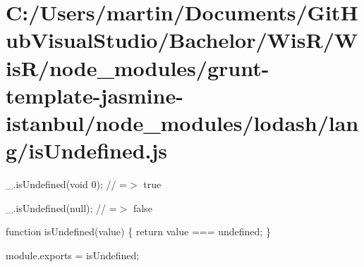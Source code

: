 \hypertarget{_c_1_2_users_2martin_2_documents_2_git_hub_visual_studio_2_bachelor_2_wis_r_2_wis_r_2node_module0dbb8e81a31460d89444081c05e94236}{}\section{C\+:/\+Users/martin/\+Documents/\+Git\+Hub\+Visual\+Studio/\+Bachelor/\+Wis\+R/\+Wis\+R/node\+\_\+modules/grunt-\/template-\/jasmine-\/istanbul/node\+\_\+modules/lodash/lang/is\+Undefined.\+js}
\+\_\+.\+is\+Undefined(void 0); // =$>$ true

\+\_\+.\+is\+Undefined(null); // =$>$ false


\begin{DoxyCodeInclude}

\textcolor{keyword}{function} isUndefined(value) \{
  \textcolor{keywordflow}{return} value === undefined;
\}

module.exports = isUndefined;
\end{DoxyCodeInclude}
 